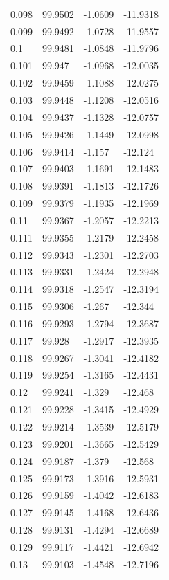 \begin{tabular}{llll}
0.098 & 99.9502 & -1.0609 & -11.9318 \\
0.099 & 99.9492 & -1.0728 & -11.9557 \\
0.1 & 99.9481 & -1.0848 & -11.9796 \\
0.101 & 99.947 & -1.0968 & -12.0035 \\
0.102 & 99.9459 & -1.1088 & -12.0275 \\
0.103 & 99.9448 & -1.1208 & -12.0516 \\
0.104 & 99.9437 & -1.1328 & -12.0757 \\
0.105 & 99.9426 & -1.1449 & -12.0998 \\
0.106 & 99.9414 & -1.157 & -12.124 \\
0.107 & 99.9403 & -1.1691 & -12.1483 \\
0.108 & 99.9391 & -1.1813 & -12.1726 \\
0.109 & 99.9379 & -1.1935 & -12.1969 \\
0.11 & 99.9367 & -1.2057 & -12.2213 \\
0.111 & 99.9355 & -1.2179 & -12.2458 \\
0.112 & 99.9343 & -1.2301 & -12.2703 \\
0.113 & 99.9331 & -1.2424 & -12.2948 \\
0.114 & 99.9318 & -1.2547 & -12.3194 \\
0.115 & 99.9306 & -1.267 & -12.344 \\
0.116 & 99.9293 & -1.2794 & -12.3687 \\
0.117 & 99.928 & -1.2917 & -12.3935 \\
0.118 & 99.9267 & -1.3041 & -12.4182 \\
0.119 & 99.9254 & -1.3165 & -12.4431 \\
0.12 & 99.9241 & -1.329 & -12.468 \\
0.121 & 99.9228 & -1.3415 & -12.4929 \\
0.122 & 99.9214 & -1.3539 & -12.5179 \\
0.123 & 99.9201 & -1.3665 & -12.5429 \\
0.124 & 99.9187 & -1.379 & -12.568 \\
0.125 & 99.9173 & -1.3916 & -12.5931 \\
0.126 & 99.9159 & -1.4042 & -12.6183 \\
0.127 & 99.9145 & -1.4168 & -12.6436 \\
0.128 & 99.9131 & -1.4294 & -12.6689 \\
0.129 & 99.9117 & -1.4421 & -12.6942 \\
0.13 & 99.9103 & -1.4548 & -12.7196 \\

\end{tabular}
